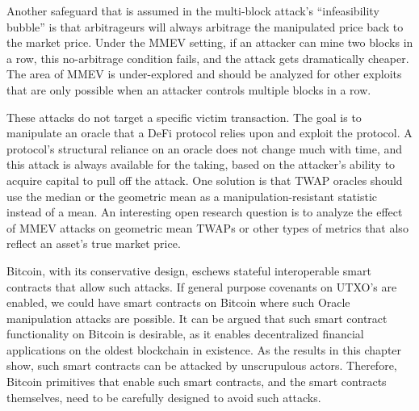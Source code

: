 Another safeguard that is assumed in the multi-block attack's ``infeasibility bubble'' is that arbitrageurs will always arbitrage the manipulated price back to the market price. Under the MMEV setting, if an attacker can mine two blocks in a row, this no-arbitrage condition fails, and the attack gets dramatically cheaper. The area of MMEV is under-explored and should be analyzed for other exploits that are only possible when an attacker controls multiple blocks in a row. 

These attacks do not target a specific victim transaction. The goal is to manipulate an oracle that a DeFi protocol relies upon and exploit the protocol. A protocol's structural reliance on an oracle does not change much with time, and this attack is always available for the taking, based on the attacker's ability to acquire capital to pull off the attack. One solution is that TWAP oracles should use the median or the geometric mean as a manipulation-resistant statistic instead of a mean. An interesting open research question is to analyze the effect of MMEV attacks on geometric mean TWAPs or other types of metrics that also reflect an asset's true market price.

Bitcoin, with its conservative design, eschews stateful interoperable smart contracts that allow such attacks. If general purpose covenants on UTXO's are enabled, we could have smart contracts on Bitcoin where such Oracle manipulation attacks are possible. It can be argued that such smart contract functionality on Bitcoin is desirable, as it enables decentralized financial applications on the oldest blockchain in existence. As the results in this chapter show, such smart contracts can be attacked by unscrupulous actors. Therefore, Bitcoin primitives that enable such smart contracts, and the smart contracts themselves, need to be carefully designed to avoid such attacks.